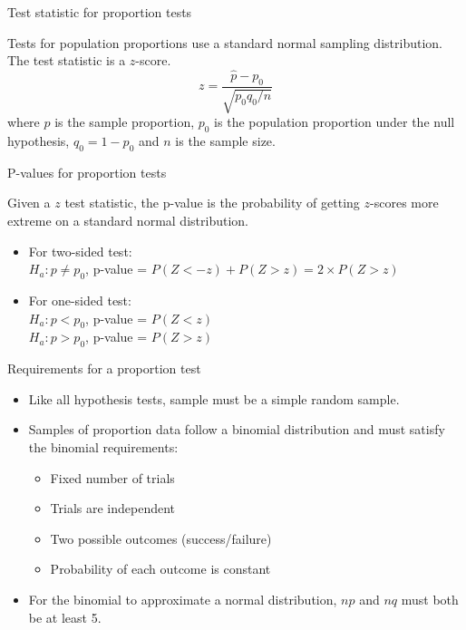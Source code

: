 \documentclass[xcolor=table, handout]{beamer}
\begin{document}
\begin{frame}{Test statistic for proportion tests}
\begin{block}{}
\large
Tests for population proportions use a standard normal sampling distribution. The test statistic is a $z$-score.
\[z = \frac {\hat p - p_0}{\sqrt{p_0q_0/n}}\]
where $\hat p$ is the sample proportion, $p_0$ is the population proportion under the null hypothesis, $q_0=1-p_0$ and $n$ is the sample size.
\end{block}

\end{frame}


\begin{frame}{P-values for proportion tests}
\begin{block}{}
\large
Given a $z$ test statistic, the p-value is the probability of getting $z$-scores more extreme on a standard normal distribution.
\begin{itemize}
\pause\item For two-sided test:\\ 
$H_a: p \ne p_0$, p-value = $P(Z<-z) + P(Z > z) = 2 \times P(Z > z)$
\pause\item For one-sided test:\\
$H_a: p < p_0$, p-value = $P(Z < z)$\\
$H_a: p > p_0$, p-value = $P(Z > z)$
\end{itemize}
\end{block}
\end{frame}

\begin{frame}{Requirements for a proportion test}
\begin{block}{}
\large
\begin{itemize}
\item Like all hypothesis tests, sample must be a simple random sample.\\
\item Samples of proportion data follow a binomial distribution and must satisfy the binomial requirements:
\begin{itemize}
\item Fixed number of trials
\item Trials are independent
\item Two possible outcomes (success/failure)
\item Probability of each outcome is constant
\end{itemize}
\item For the binomial to approximate a normal distribution, $np$ and $nq$ must both be at least 5.
\end{itemize}
\end{block}
\end{frame}
\end{document}
